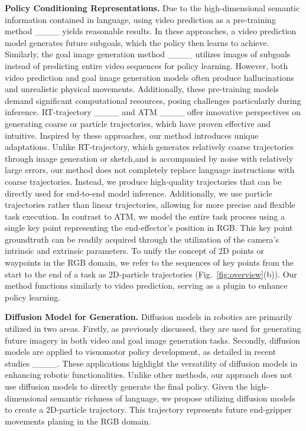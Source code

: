 \textbf{Policy Conditioning Representations.}
Due to the high-dimensional semantic information contained in language, using video prediction as a pre-training method ____ yields reasonable results. In these approaches, a video prediction model generates future subgoals, which the policy then learns to achieve. Similarly, the goal image generation method ____ utilizes images of subgoals instead of predicting entire video sequences for policy learning. However, both video prediction and goal image generation models often produce hallucinations and unrealistic physical movements. Additionally, these pre-training models demand significant computational resources, posing challenges particularly during inference. 
RT-trajectory ____ and ATM ____ offer innovative perspectives on generating coarse or particle trajectories, which have proven effective and intuitive. Inspired by these approaches, our method introduces unique adaptations. 
Unlike RT-trajectory, which generates relatively coarse trajectories through image generation or sketch,and is accompanied by noise with relatively large errors, our method does not completely replace language instructions with coarse trajectories. Instead, we produce high-quality trajectories that can be directly used for end-to-end model inference. Additionally, we use particle trajectories rather than linear trajectories, allowing for more precise and flexible task execution.
In contrast to ATM, we model the entire task process using a single key point representing the end-effector's position in RGB. This key point groundtruth can be readily acquired through the utilization of the camera's intrinsic and extrinsic parameters. To unify the concept of 2D points or waypoints in the RGB domain, we refer to the sequences of key points from the start to the end of a task as 2D-particle trajectories (Fig.~\ref{fig:overview}(b)). Our method functions similarly to video prediction, serving as a plugin to enhance policy learning.

\textbf{Diffusion Model for Generation.}
Diffusion models in robotics are primarily utilized in two areas. Firstly, as previously discussed, they are used for generating future imagery in both video and goal image generation tasks. Secondly, diffusion models are applied to visuomotor policy development, as detailed in recent studies ____. These applications highlight the versatility of diffusion models in enhancing robotic functionalities. 
Unlike other methods, our approach does not use diffusion models to directly generate the final policy. Given the high-dimensional semantic richness of language, we propose utilizing diffusion models to create a 2D-particle trajectory. This trajectory represents future end-gripper movements planing in the RGB domain.

